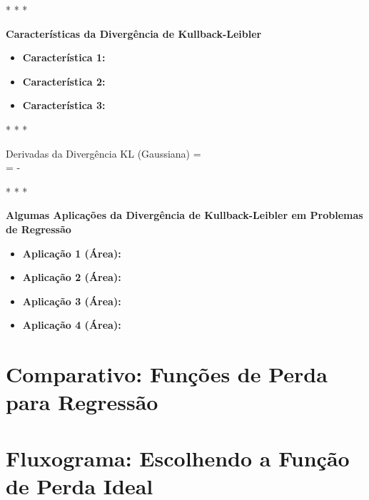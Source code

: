 \medskip
\begin{center}
 * * *
\end{center}
\medskip

\textbf{Características da Divergência de Kullback-Leibler} 
\vspace{1em}

\begin{itemize}
    \item \textbf{Característica 1:}
    \item \textbf{Característica 2:}
    \item \textbf{Característica 3:}
\end{itemize}

\medskip
\begin{center}
 * * *
\end{center}
\medskip

\begin{equacaodestaque}{Derivadas da Divergência KL (Gaussiana)}
     = 
    \\[10pt] %
     =  - 
    \label{eq:kl-divergence-derivada-gaussiana}
\end{equacaodestaque}

\medskip
\begin{center}
 * * *
\end{center}
\medskip

\textbf{Algumas Aplicações da Divergência de Kullback-Leibler em Problemas de Regressão} 
\vspace{1em}

\begin{itemize}
    \item \textbf{Aplicação 1 (Área):}
    \item \textbf{Aplicação 2 (Área):}
    \item \textbf{Aplicação 3 (Área):}
    \item \textbf{Aplicação 4 (Área):}
\end{itemize}

\section{Comparativo: Funções de Perda para Regressão}

\section{Fluxograma: Escolhendo a Função de Perda Ideal}
